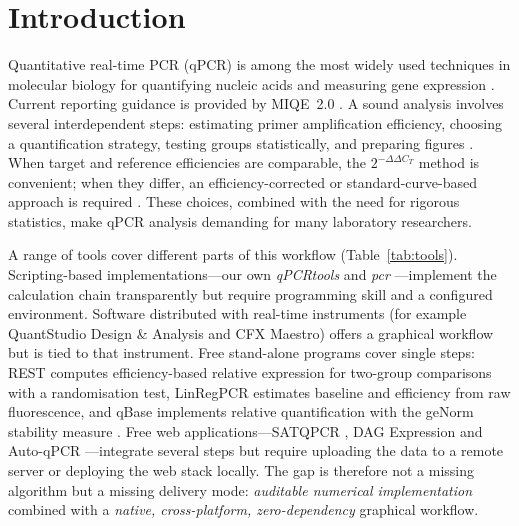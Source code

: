 \section{Introduction}

Quantitative real-time PCR (qPCR) is among the most widely used techniques
in molecular biology for quantifying nucleic acids and measuring gene
expression \cite{bustin2009miqe}. Current reporting guidance is provided by
MIQE~2.0 \cite{bustin2025miqe2}. A sound analysis involves several
interdependent steps: estimating primer amplification efficiency, choosing a
quantification strategy, testing groups statistically, and preparing figures
\cite{bustin2010miqe}. When target and reference efficiencies are comparable,
the $2^{-\Delta\Delta C_T}$ method \cite{livak2001analysis} is convenient;
when they differ, an efficiency-corrected or standard-curve-based approach is
required \cite{pfaffl2001new}. These choices, combined with the need for
rigorous statistics, make qPCR analysis demanding for many laboratory
researchers.

{\sloppy A range of tools cover different parts of this workflow
(Table~\ref{tab:tools}). Scripting-based implementations---our own
\textit{qPCRtools} \cite{li2022qpcrtools} and \textit{pcr}
\cite{ahmed2018pcr}---implement the calculation chain transparently but
require programming skill and a configured environment. Software distributed
with real-time instruments (for example QuantStudio Design \& Analysis and
CFX Maestro) offers a graphical workflow but is tied to that instrument.
Free stand-alone programs cover single steps: REST \cite{pfaffl2002rest}
computes efficiency-based relative expression for two-group comparisons with
a randomisation test, LinRegPCR
\cite{ramakers2003linregpcr,ruijter2009linregpcr} estimates baseline and
efficiency from raw fluorescence, and qBase \cite{hellemans2007qbase}
implements relative quantification with the geNorm stability measure
\cite{vandesompele2002accurate}. Free web applications---SATQPCR
\cite{rancurel2019satqpcr}, DAG Expression \cite{ballester2013dag} and
Auto-qPCR \cite{maussion2021autoqpcr}---integrate several steps but require
uploading the data to a remote server or deploying the web stack locally. The
gap is therefore not a missing algorithm but a missing delivery mode:
\emph{auditable numerical implementation} combined with a \emph{native,
cross-platform, zero-dependency} graphical workflow.
\par}

